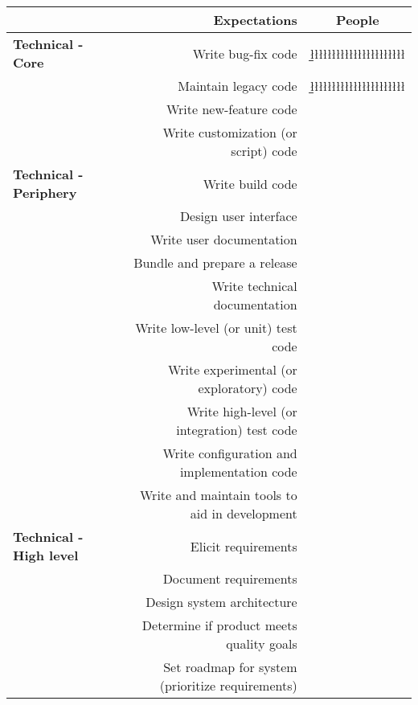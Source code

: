 \begin{table*}[tb]
\centering
\begin{tabular}{l@{\hspace{-3cm}}r@{\hspace{2pt}}c}
\toprule
& Expectations &People\\
\midrule
\textbf{Technical - Core} 
&Write bug-fix code&  \w\w\l\w\g\b\b\b\g\w\w\w\w\w\l\l\l\l\l\l\l\l\l\l\l\l\l\l\l\l\l\l\l\l\l \\
&Maintain legacy code&  \w\w\l\w\g\b\b\b\g\w\w\w\w\w\l\l\l\l\l\l\l\l\l\l\l\l\l\l\l\l\l\l\l\l\l \\
&Write new-feature code&\\
&Write customization (or script) code&\\
%
%
\midrule
\textbf{Technical - Periphery}
& Write build code&\\
& Design user interface&\\
& Write user documentation&\\
& Bundle and prepare a release&\\
& Write technical documentation&\\
&Write low-level (or unit) test code&\\
& Write experimental (or exploratory) code&\\
& Write high-level (or integration) test code&\\
& Write configuration and implementation code&\\
& Write and maintain tools to aid in development&\\
%
%
\midrule
\textbf{Technical - High level}
& Elicit requirements&\\
& Document requirements&\\
& Design system architecture&\\
& Determine if product meets quality goals&\\
& Set roadmap for system (prioritize requirements)&\\

\end{tabular}
\end{table*}
